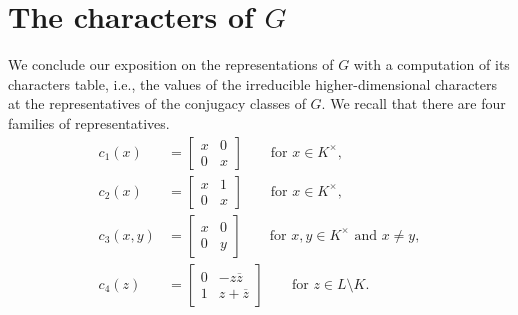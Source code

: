 \documentclass[../main.tex]{subfiles}
\begin{document}
\section{The characters of \texorpdfstring{$G$}{ G}}
We conclude our exposition on the representations of $G$ with a computation of its characters table, i.e., the values of the irreducible higher-dimensional characters at the representatives of the conjugacy classes of $G$. We recall that there are four families of representatives.
\begin{align*}
	c_1(x) &= \begin{bmatrix}
		x & 0 \\
		0 & x
	\end{bmatrix} \qquad\text{for }x\in K^\times, \\
	c_2(x) &= \begin{bmatrix}
		x & 1 \\
		0 & x
	\end{bmatrix} \qquad\text{for }x\in K^\times, \\
	c_3(x,y) &= \begin{bmatrix}
		x & 0 \\
		0 & y
	\end{bmatrix} \qquad\text{for }x,y\in K^\times\text{ and }x\ne y, \\
	c_4(z) &= \begin{bmatrix}
		0 & -z\overline z \\
		1 & z+\overline z
	\end{bmatrix} \qquad\text{for }z\in L\setminus K.
\end{align*}
\end{document}
